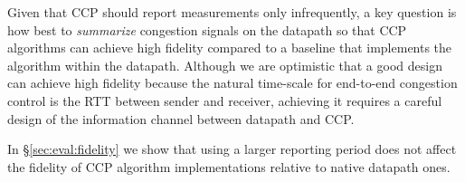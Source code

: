 \fi

Given that CCP should report measurements only infrequently, a key question is how best to {\em summarize} congestion signals on the datapath so that CCP algorithms can achieve high fidelity compared to a baseline that implements the algorithm within the datapath. 
Although we are optimistic that a good design can achieve high fidelity because the natural time-scale for end-to-end congestion control is the RTT between sender and receiver, achieving it requires a careful design of the information channel between datapath and CCP. 

In \S\ref{sec:eval:fidelity} we show that using a larger reporting period does not affect the fidelity of CCP algorithm implementations relative to native datapath ones. 
